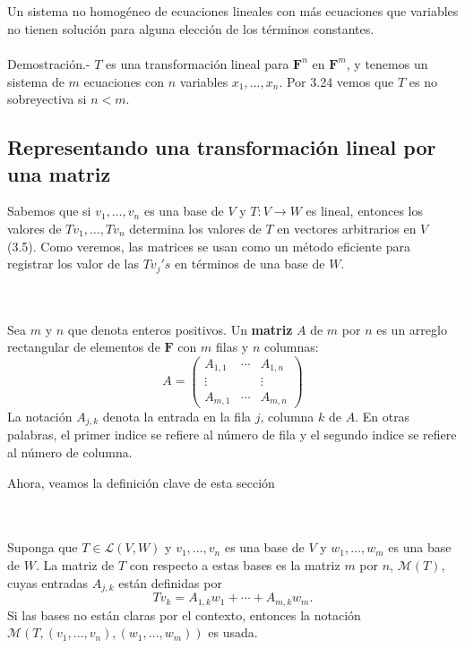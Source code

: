 \setcounter{myteo}{28}
\begin{myteo}\,\\\\
    Un sistema no homogéneo de ecuaciones lineales con más ecuaciones que variables no tienen solución para alguna elección de los términos constantes.\\\\
	Demostración.-\; $T$ es una transformación lineal para $\textbf{F}^n$ en $\textbf{F}^m$, y tenemos un sistema de $m$ ecuaciones con $n$ variables $x_1,\ldots,x_n$. Por 3.24 vemos que $T$ es no sobreyectiva si $n<m$.
\end{myteo}




\subsection*{Representando una transformación lineal por una matriz}

Sabemos que si $v_1,\ldots,v_n$ es una base de $V$ y $T:V\to W$ es lineal, entonces los valores de $Tv_1,\ldots,Tv_n$ determina los valores de $T$ en vectores arbitrarios en $V$ (3.5). Como veremos, las matrices se usan como un método eficiente para registrar los valor de las $Tv_j's$ en términos de una base de $W$.

\begin{mydef}\;\\\\
    Sea $m$ y $n$ que denota enteros positivos. Un \textbf{matriz} $A$ de $m$ por $n$ es un arreglo rectangular de elementos de $\textbf{F}$ con $m$ filas y $n$ columnas:
    $$
    A=
    \begin{pmatrix}
	A_{1,1} & \cdots & A_{1,n}\\
	\vdots &  & \vdots\\
	A_{m,1} & \cdots & A_{m,n}
    \end{pmatrix}
    $$
    La notación $A_{j,k}$ denota la entrada en la fila $j$, columna $k$ de $A$. En otras palabras, el primer indice se refiere al número de fila y el segundo indice se refiere al número de columna.
\end{mydef}

Ahora, veamos la definición clave de esta sección

\setcounter{mydef}{31}
\begin{mydef}\;\\\\
    Suponga que $T\in \mathcal{L}(V,W)$ y $v_1,\ldots,v_n$ es una base de $V$ y $w_1,\ldots,w_m$ es una base de $W$. La matriz de $T$ con respecto a estas bases es la matriz $m$ por $n$, $\mathcal{M}(T)$, cuyas entradas $A_{j,k}$ están definidas por
    $$Tv_k = A_{1,k}w_1+\cdots+A_{m,k}w_m.$$
    Si las bases no están claras por el contexto, entonces la notación $\mathcal{M}\left(T,(v_1,\ldots,v_n),(w_1,\ldots,w_m)\right)$  es usada.
\end{mydef}

